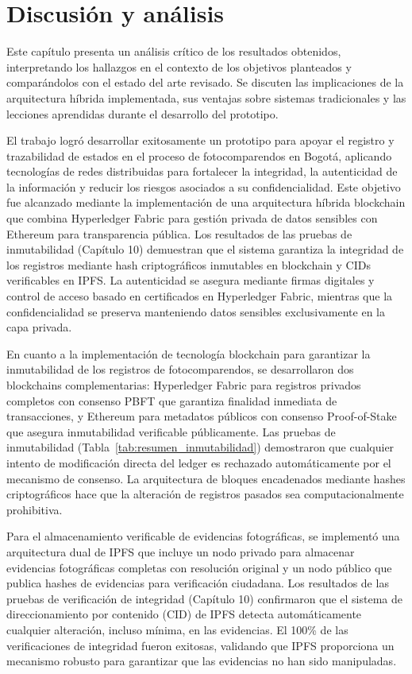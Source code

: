 \section{Discusión y análisis}

Este capítulo presenta un análisis crítico de los resultados obtenidos, interpretando los hallazgos en el contexto de los objetivos planteados y comparándolos con el estado del arte revisado. Se discuten las implicaciones de la arquitectura híbrida implementada, sus ventajas sobre sistemas tradicionales y las lecciones aprendidas durante el desarrollo del prototipo.

El trabajo logró desarrollar exitosamente un prototipo para apoyar el registro y trazabilidad de estados en el proceso de fotocomparendos en Bogotá, aplicando tecnologías de redes distribuidas para fortalecer la integridad, la autenticidad de la información y reducir los riesgos asociados a su confidencialidad. Este objetivo fue alcanzado mediante la implementación de una arquitectura híbrida blockchain que combina Hyperledger Fabric para gestión privada de datos sensibles con Ethereum para transparencia pública. Los resultados de las pruebas de inmutabilidad (Capítulo 10) demuestran que el sistema garantiza la integridad de los registros mediante hash criptográficos inmutables en blockchain y CIDs verificables en IPFS. La autenticidad se asegura mediante firmas digitales y control de acceso basado en certificados en Hyperledger Fabric, mientras que la confidencialidad se preserva manteniendo datos sensibles exclusivamente en la capa privada.

En cuanto a la implementación de tecnología blockchain para garantizar la inmutabilidad de los registros de fotocomparendos, se desarrollaron dos blockchains complementarias: Hyperledger Fabric para registros privados completos con consenso PBFT que garantiza finalidad inmediata de transacciones, y Ethereum para metadatos públicos con consenso Proof-of-Stake que asegura inmutabilidad verificable públicamente. Las pruebas de inmutabilidad (Tabla~\ref{tab:resumen_inmutabilidad}) demostraron que cualquier intento de modificación directa del ledger es rechazado automáticamente por el mecanismo de consenso. La arquitectura de bloques encadenados mediante hashes criptográficos hace que la alteración de registros pasados sea computacionalmente prohibitiva.

Para el almacenamiento verificable de evidencias fotográficas, se implementó una arquitectura dual de IPFS que incluye un nodo privado para almacenar evidencias fotográficas completas con resolución original y un nodo público que publica hashes de evidencias para verificación ciudadana. Los resultados de las pruebas de verificación de integridad (Capítulo 10) confirmaron que el sistema de direccionamiento por contenido (CID) de IPFS detecta automáticamente cualquier alteración, incluso mínima, en las evidencias. El 100\% de las verificaciones de integridad fueron exitosas, validando que IPFS proporciona un mecanismo robusto para garantizar que las evidencias no han sido manipuladas.

